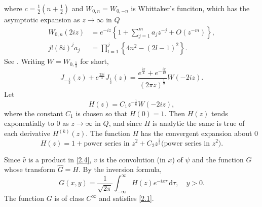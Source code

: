 \documentclass[leqno]{article}
\numberwithin{equation}{section}
\theoremstyle{plain}
\newcommand{\dd}{\,\mathrm{d}}
\begin{document}
where $c = \frac 12 \left(n+\frac 12\right)$ and $W_{0,n} = W_{0,-n}$ is Whittaker's funciton, which has the asymptotic expansion as $z \to \infty$ in $Q$
\begin{align}
	\label{2.5}
	W_{0,n}(2iz) & = e^{-iz} \left\{ 1 + \sum_{j=1}^m a_j z^{-j} + O(z^{-m})\right\}, \\
	\nonumber
	j! (8i)^j a_j &= \prod_{l = 1}^j \left\{4n^2-(2l-1)^2\right\}.
\end{align}
See \cite[p.\ 362]{WW}.
Writing $W = W_{0,\frac 13}$ for short,
\begin{equation*}
	J_{-\frac 13}(z) + e^{\frac{2\pi i}{3}} J_{\frac 13}(z) = \frac{e^{\frac{i\pi}{4}}+e^{-\frac{i\pi}{12}}}{(2\pi z)^{\frac 12}} W(-2iz).
\end{equation*}
Let
\begin{equation}
	\label{2.6}
	H(z) = C_1 z^{-\frac 16} W(-2iz),
\end{equation}
where the constant $C_1$ is chosen so that $H(0)=1$.
Then $H(z)$ tends exponentially to $0$ as $z \to \infty$ in $Q$, and since $H$ is analytic the same is true of each derivative $H^{(k)}(z)$.
The function $H$ has the convergent expansion about $0$
\begin{equation*}
	H(z) = 1 + \text{power series in } z^2 + C_2 z^{\frac 23} \text{(power series in $z^2$)}.
\end{equation*}

Since $\hat{v}$ is a product in \eqref{2.4}, $v$ is the convolution (in $x$) of $\psi$ and the function $G$ whose transform $\hat{G} = H$.
By the inversion formula,
\begin{equation}
	\label{2.7}
	G(x,y) = \frac{1}{\sqrt{2\pi}} \int_{-\infty}^{\infty} H(z)e^{-ix\tau} \dd \tau,
	\quad 
	y > 0.
\end{equation}
The function $G$ is of class $C^\infty$ and satisfies \eqref{2.1}.
\end{document}
